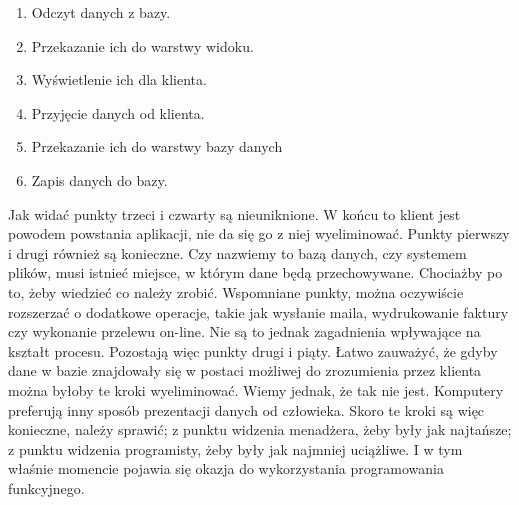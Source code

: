 \documentclass[a4paper,10pt]{report}
\begin{document}
\begin{enumerate}
	\item Odczyt danych z bazy. 
	\item Przekazanie ich do warstwy widoku. 
	\item Wyświetlenie ich dla klienta.
	\item Przyjęcie danych od klienta.
	\item Przekazanie ich do warstwy bazy danych
	\item Zapis danych do bazy.
\end{enumerate}
Jak widać punkty trzeci i czwarty są nieuniknione. W końcu to klient jest powodem powstania aplikacji, nie da się go z niej wyeliminować. Punkty pierwszy i drugi również są konieczne. Czy nazwiemy to bazą danych, czy systemem plików, musi istnieć miejsce, w którym dane będą przechowywane. Chociażby po to, żeby wiedzieć co należy zrobić. Wspomniane punkty, można oczywiście rozszerzać o dodatkowe operacje, takie jak wysłanie maila, wydrukowanie faktury czy wykonanie przelewu on-line. Nie są to jednak zagadnienia wpływające na kształt procesu. Pozostają więc punkty drugi i piąty. Łatwo zauważyć, że gdyby dane w bazie znajdowały się w postaci możliwej do zrozumienia przez klienta można byłoby te kroki wyeliminować. Wiemy jednak, że tak nie jest. Komputery preferują inny sposób prezentacji danych od człowieka. Skoro te kroki są więc konieczne, należy sprawić; z punktu widzenia menadżera, żeby były jak najtańsze; z punktu widzenia programisty, żeby były jak najmniej uciążliwe. I w tym właśnie momencie pojawia się okazja do wykorzystania programowania funkcyjnego.
\end{document}
